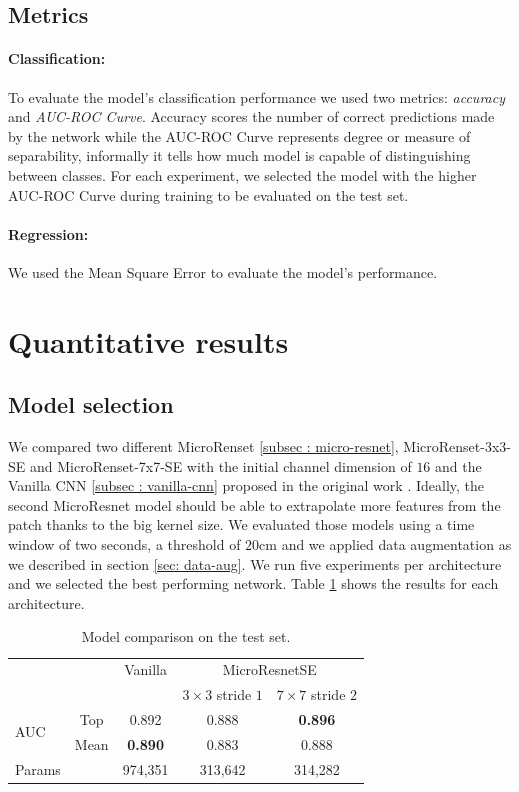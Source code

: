 \documentclass[../document.tex]{subfiles}
\begin{document}
\subsection{Metrics}

\paragraph{Classification:} To evaluate the model's classification performance we used two metrics: \emph{accuracy} and \emph{AUC-ROC Curve}. Accuracy scores the number of correct predictions made by the network while the AUC-ROC Curve represents degree or measure of separability, informally it tells how much model is capable of distinguishing between classes. For each experiment, we selected the model with the higher AUC-ROC Curve during training to be evaluated on the test set.



\paragraph{Regression:} We used the Mean Square Error to evaluate the model's performance.
\section{Quantitative results}
\subsection{Model selection}
We compared two different MicroRenset \ref{subsec : micro-resnet}, MicroRenset-3x3-SE and MicroRenset-7x7-SE with the initial channel dimension of $16$  and the Vanilla CNN \ref{subsec : vanilla-cnn} proposed in the original work \cite{omar2018traversability}.  Ideally, the second MicroResnet model should be able to extrapolate more features from the patch thanks to the big kernel size. We evaluated those models using a time window of two seconds, a threshold of $20$cm and we applied data augmentation as we described in section \ref{sec: data-aug}. We run five experiments per architecture and we selected the best performing network. Table \ref{tab : models-results-comparison} shows the results for each architecture.

\begin{table}[ht]
  \centering
  \begin{tabular}{@{}lcccc@{}}
  \toprule
   && Vanilla & \multicolumn{2}{c}{MicroResnetSE} \\
  \cline{3-5}
  && & $3\times 3$ stride $1$ & $7\times7$ stride $2$\\ 
  \cline{3-5}
  \multirow{2}{*}{AUC} & Top & 0.892 & 0.888 & \textbf{0.896}\\
   & Mean & \textbf{0.890} & 0.883 & 0.888\\
  \cline{1-5}
  Params & & 974,351 & 313,642 & 314,282  \\
  \bottomrule   
\end{tabular}
\caption{Model comparison on the test set.}
\label{tab : models-results-comparison}
\end{table}
\end{document}
